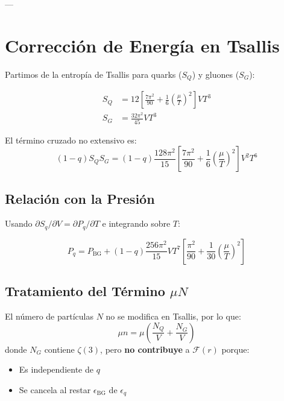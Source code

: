 

---


\section{Corrección de Energía en Tsallis} \label{app:tsallis-energy}
Partimos de la entropía de Tsallis para quarks ($S_Q$) y gluones ($S_G$):

\begin{align}
S_Q &= 12\left[\frac{7\pi^2}{90} + \frac{1}{6}\left(\frac{\mu}{T}\right)^2\right]VT^3 \label{eq:SQ} \\
S_G &= \frac{32\pi^2}{45}VT^3 \label{eq:SG}
\end{align}

El término cruzado no extensivo es:
\begin{equation} \label{eq:cross-term}
(1-q)S_Q S_G = (1-q)\frac{128\pi^2}{15}\left[\frac{7\pi^2}{90} + \frac{1}{6}\left(\frac{\mu}{T}\right)^2\right]V^2T^6
\end{equation}

\subsection{Relación con la Presión}
Usando $\partial S_q/\partial V = \partial P_q/\partial T$ e integrando sobre $T$:

\begin{equation}
P_q = P_{\text{BG}} + (1-q)\frac{256\pi^2}{15}VT^7\left[\frac{\pi^2}{90} + \frac{1}{30}\left(\frac{\mu}{T}\right)^2\right]
\end{equation}

\subsection{Tratamiento del Término $\mu N$}
El número de partículas $N$ no se modifica en Tsallis, por lo que:
\begin{equation}
\mu n = \mu\left(\frac{N_Q}{V} + \frac{N_G}{V}\right)
\end{equation}
donde $N_G$ contiene $\zeta(3)$, pero \textbf{no contribuye} a $\mathcal{F}(r)$ porque:
\begin{itemize}
    \item Es independiente de $q$
    \item Se cancela al restar $\epsilon_{\text{BG}}$ de $\epsilon_q$
\end{itemize}

